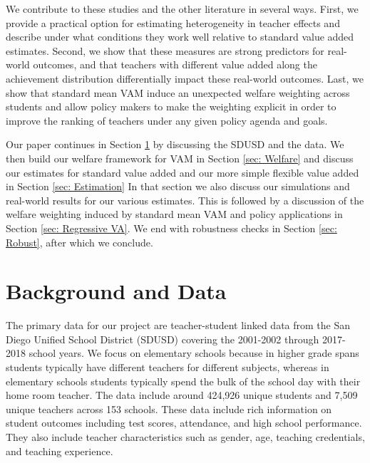 \documentclass[letterpaper,12pt]{article}
\begin{document}
We contribute to these studies and the other literature in several ways. First, we provide a practical option for estimating heterogeneity in teacher effects and describe under what conditions they work well relative to standard value added estimates. Second, we show that these measures are strong predictors for real-world outcomes, and that teachers with different value added along the achievement distribution differentially impact these real-world outcomes. Last, we show that standard mean VAM induce an unexpected welfare weighting across students and allow policy makers to make the weighting explicit in order to improve the ranking of teachers under any given policy agenda and goals.

Our paper continues in Section \ref{sec: Data} by discussing the SDUSD and the data. We then build our welfare framework for VAM in Section \ref{sec: Welfare} and discuss our estimates for standard value added and our more simple flexible value added in Section \ref{sec: Estimation} In that section we also discuss our simulations and real-world results for our various estimates. This is followed by a discussion of the welfare weighting induced by standard mean VAM and policy applications in Section \ref{sec: Regressive VA}. We end with robustness checks in Section \ref{sec: Robust}, after which we conclude.




\section{Background and Data}\label{sec: Data}

The primary data for our project are teacher-student linked data from the San Diego Unified School District (SDUSD) covering the 2001-2002 through 2017-2018 school years. We focus on elementary schools because in higher grade spans students typically have different teachers for different subjects, whereas in elementary schools students typically spend the bulk of the school day with their home room teacher. The data include around 424,926 unique students and 7,509 unique teachers across 153 schools. These data include rich information on student outcomes including test scores, attendance, and high school performance. They also include teacher characteristics such as gender, age, teaching credentials, and teaching experience.
\end{document}
